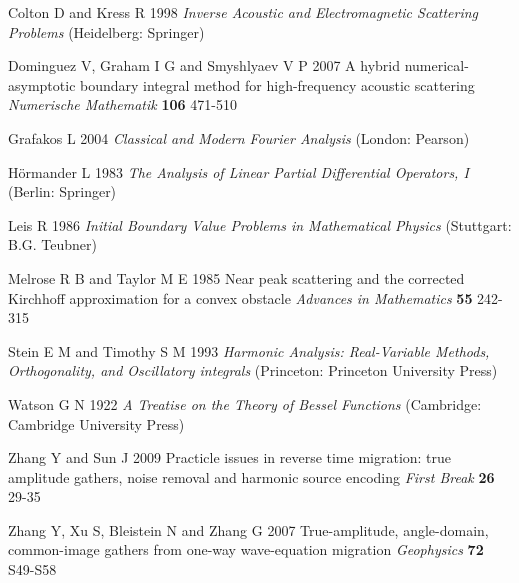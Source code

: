 \documentclass[11pt]{iopart}
\begin{document}
\begin{thebibliography}{99}
Colton D  and   Kress R 1998 {\em Inverse Acoustic and Electromagnetic Scattering Problems } (Heidelberg: Springer)

Dominguez V, Graham I G  and Smyshlyaev V P 2007
{A hybrid numerical-asymptotic boundary integral method for high-frequency acoustic scattering}
{\it Numerische Mathematik} {\bf 106 } 471-510

{Grafakos L} 2004 {\em Classical and Modern Fourier Analysis } (London: Pearson)

H\"ormander L 1983 {\em The Analysis of Linear Partial Differential Operators, I} {(Berlin: Springer)}

{Leis R} 1986 {\em Initial Boundary Value Problems in Mathematical Physics} {(Stuttgart: B.G. Teubner)}

Melrose R B and  Taylor M E 1985 {Near peak scattering and the corrected Kirchhoff approximation for a convex obstacle} {\it Advances in Mathematics} {\bf 55} 242-315

Stein E  M  and Timothy S  M  1993 {\em Harmonic Analysis: Real-Variable Methods, Orthogonality, and Oscillatory integrals} (Princeton: Princeton University Press)

{ Watson G N} 1922 {\em A Treatise on the Theory of Bessel Functions} (Cambridge: Cambridge University Press)

 Zhang Y and Sun J 2009 {Practicle issues in reverse time migration: true amplitude gathers, noise removal and harmonic source encoding}
 {\it First Break} {\bf 26}  29-35

 Zhang Y, Xu S, Bleistein N and Zhang G 2007 {True-amplitude, angle-domain, common-image gathers from one-way wave-equation migration}
  {\it Geophysics} {\bf 72} S49-S58

\end{thebibliography}
\end{document}

